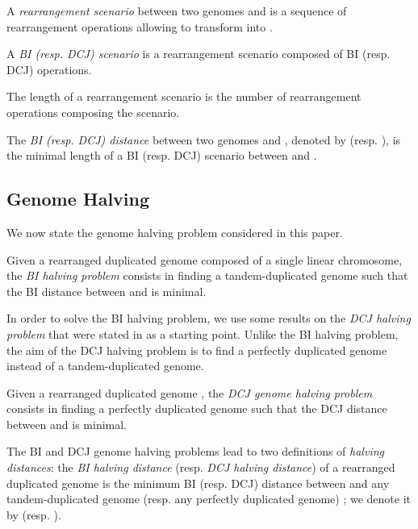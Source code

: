 \documentclass{llncs}
\begin{document}
A \emph{rearrangement scenario} between two genomes  and  is a sequence of rearrangement operations allowing to transform  into .

\begin{definition}
A \emph{BI (resp. DCJ) scenario} is a rearrangement scenario composed of BI (resp. DCJ) operations.
\end{definition}


The length of a rearrangement scenario is the number of rearrangement operations composing the scenario. 
\begin{definition}
The \emph{BI (resp. DCJ) distance} between two genomes  and , denoted by  (resp. ), is the minimal length of a  BI (resp. DCJ) scenario between  and .
\end{definition}


\subsection*{Genome Halving}
\label{sec:halving}


We now state the genome halving problem considered in this paper.

\begin{definition}
Given a rearranged duplicated genome  composed of a single linear chromosome, the \emph{BI halving problem} consists in finding a tandem-duplicated genome  such that the BI distance between  and  is minimal.
\end{definition}

In order to solve the BI halving problem, we use some results on the \emph{DCJ halving problem} that were stated in \cite{Mixtacki08} as a starting point. Unlike the BI halving problem, the aim of the DCJ halving problem is to find a perfectly duplicated genome instead of a tandem-duplicated genome.

\begin{definition}
Given a rearranged duplicated genome , the \emph{DCJ genome halving problem} 
consists in finding a perfectly duplicated genome  such that the DCJ distance
between  and  is minimal.
\end{definition}

The BI and DCJ genome halving problems lead to two definitions of \emph{halving distances}: the \emph{BI halving distance} (resp. \emph{DCJ halving distance}) of a rearranged duplicated genome  is the minimum BI (resp. DCJ) distance between  and any tandem-duplicated genome (resp. any perfectly duplicated genome) ; we denote it by  (resp. ).\\
\end{document}
